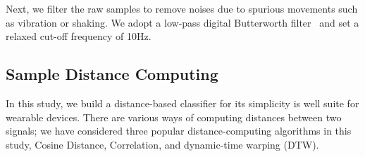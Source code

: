 Next, we filter the raw samples to remove noises due to spurious movements such as vibration or shaking. 
We adopt a low-pass digital Butterworth
filter~\cite{challis1983design} and set a relaxed cut-off frequency of 10Hz.


\subsection{Sample Distance Computing}


In this study, we build a distance-based classifier for its simplicity is well suite for wearable devices. There are various ways of computing distances between two signals; we have considered three popular distance-computing algorithms in this study, Cosine Distance, Correlation, and dynamic-time warping (DTW). 

